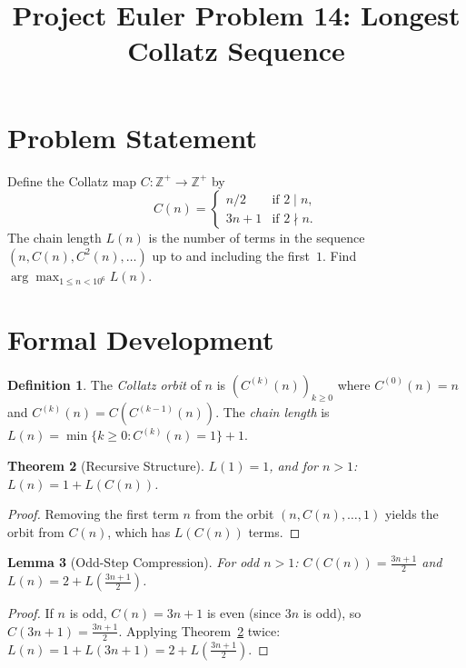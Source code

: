 \documentclass[12pt]{article}
\title{Project Euler Problem 14: Longest Collatz Sequence}
\author{}
\date{}
\newtheorem{theorem}{Theorem}
\newtheorem{lemma}[theorem]{Lemma}
\theoremstyle{definition}
\newtheorem{definition}[theorem]{Definition}
\begin{document}
\maketitle

\section{Problem Statement}

Define the Collatz map $C : \mathbb{Z}^+ \to \mathbb{Z}^+$ by
\[
C(n) = \begin{cases} n/2 & \text{if } 2 \mid n, \\ 3n + 1 & \text{if } 2 \nmid n. \end{cases}
\]
The chain length $L(n)$ is the number of terms in the sequence $(n, C(n), C^2(n), \ldots)$ up to and including the first~$1$. Find $\arg\max_{1 \le n < 10^6} L(n)$.

\section{Formal Development}

\begin{definition}
The \emph{Collatz orbit} of $n$ is $(C^{(k)}(n))_{k \ge 0}$ where $C^{(0)}(n) = n$ and $C^{(k)}(n) = C(C^{(k-1)}(n))$. The \emph{chain length} is $L(n) = \min\{k \ge 0 : C^{(k)}(n) = 1\} + 1$.
\end{definition}

\begin{theorem}[Recursive Structure]
\label{thm:recur}
$L(1) = 1$, and for $n > 1$: $L(n) = 1 + L(C(n))$.
\end{theorem}

\begin{proof}
Removing the first term $n$ from the orbit $(n, C(n), \ldots, 1)$ yields the orbit from $C(n)$, which has $L(C(n))$ terms.
\end{proof}

\begin{lemma}[Odd-Step Compression]
\label{lem:odd}
For odd $n > 1$: $C(C(n)) = \frac{3n+1}{2}$ and $L(n) = 2 + L\!\left(\frac{3n+1}{2}\right)$.
\end{lemma}

\begin{proof}
If $n$ is odd, $C(n) = 3n+1$ is even (since $3n$ is odd), so $C(3n+1) = \frac{3n+1}{2}$. Applying Theorem~\ref{thm:recur} twice: $L(n) = 1 + L(3n+1) = 2 + L\!\left(\frac{3n+1}{2}\right)$.
\end{proof}
\end{document}
